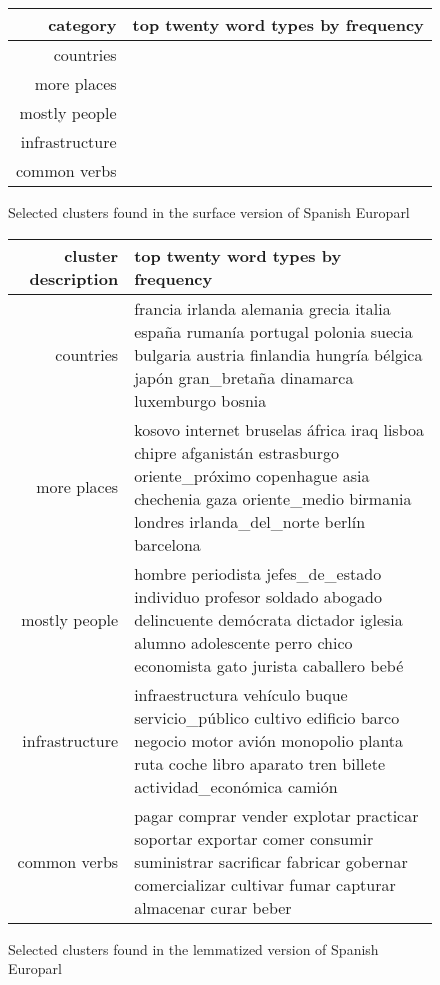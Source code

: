 \begin{figure*}[t!]
  \begin{tabular}{|r|p{10cm}|}
    \hline
    category  & top twenty word types by frequency \\
    \hline
    countries &  \\
    \hline
    more places & \\
    \hline
    mostly people & \\
    \hline
    infrastructure & \\
    \hline
    common verbs & \\
    \hline
  \end{tabular}
\caption{Selected clusters found in the surface version of Spanish Europarl}
\label{fig:clusters-europarl-surface}
\end{figure*}

\begin{figure*}[t!]
  \begin{tabular}{|r|p{10cm}|}
    \hline
    cluster description  & top twenty word types by frequency \\
    \hline
    countries & francia irlanda alemania grecia italia españa rumanía portugal polonia suecia bulgaria austria finlandia hungría bélgica japón gran\_bretaña dinamarca luxemburgo bosnia \\
    \hline
    more places & kosovo internet bruselas áfrica iraq lisboa chipre afganistán estrasburgo oriente\_próximo copenhague asia chechenia gaza oriente\_medio birmania londres irlanda\_del\_norte berlín barcelona \\
    \hline
    mostly people & hombre periodista jefes\_de\_estado individuo profesor soldado abogado delincuente demócrata dictador iglesia alumno adolescente perro chico economista gato jurista caballero bebé \\
    \hline
    infrastructure & infraestructura vehículo buque servicio\_público cultivo edificio barco negocio motor avión monopolio planta ruta coche libro aparato tren billete actividad\_económica camión \\
    \hline
    common verbs & pagar comprar vender explotar practicar soportar exportar comer consumir suministrar sacrificar fabricar gobernar comercializar cultivar fumar capturar almacenar curar beber \\
    \hline
  \end{tabular}
\caption{Selected clusters found in the lemmatized version of Spanish Europarl}
\label{fig:clusters-europarl-lemma}
\end{figure*}

